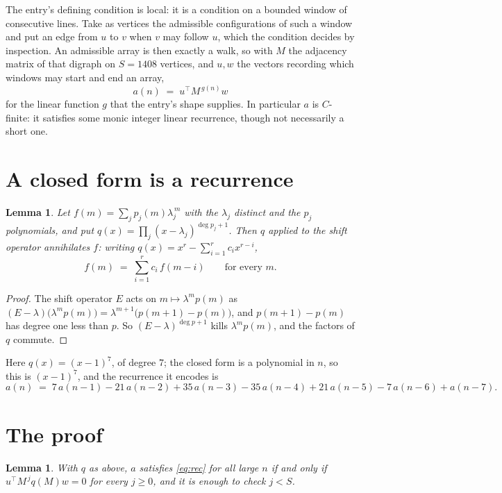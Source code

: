 \documentclass[11pt,a4paper]{article}
\theoremstyle{plain}
\newtheorem{lemma}[theorem]{Lemma}
\theoremstyle{definition}
\begin{document}
The entry's defining condition is local: it is a condition on a bounded window of consecutive lines. Take as vertices the
admissible configurations of such a window and put an edge from $u$ to $v$ when $v$ may
follow $u$, which the condition decides by inspection. An admissible array is then exactly a
walk, so with $M$ the adjacency matrix of that digraph on $S=1408$ vertices, and $u,w$ the
vectors recording which windows may start and end an array,
\[
a(n)\;=\;u^{\!\top}M^{\,g(n)}w
\]
for the linear function $g$ that the entry's shape supplies. In particular $a$ is
$C$-finite: it satisfies some monic integer linear recurrence, though not necessarily a short
one.

\section{A closed form is a recurrence}

\begin{lemma}\label{lem:ann}
Let $f(m)=\sum_{j}p_j(m)\lambda_j^{\,m}$ with the $\lambda_j$ distinct and the $p_j$
polynomials, and put $q(x)=\prod_j(x-\lambda_j)^{\deg p_j+1}$. Then $q$ applied to the shift
operator annihilates $f$: writing $q(x)=x^{r}-\sum_{i=1}^{r}c_ix^{r-i}$,
\[
f(m)\;=\;\sum_{i=1}^{r}c_i\,f(m-i)\qquad\text{for every }m.
\]
\end{lemma}

\begin{proof}
The shift operator $E$ acts on $m\mapsto\lambda^{m}p(m)$ as
$(E-\lambda)\bigl(\lambda^{m}p(m)\bigr)=\lambda^{m+1}\bigl(p(m+1)-p(m)\bigr)$, and
$p(m+1)-p(m)$ has degree one less than $p$. So $(E-\lambda)^{\deg p+1}$ kills
$\lambda^{m}p(m)$, and the factors of $q$ commute.
\end{proof}

Here $q(x)=(x-1)^{7}$, of degree $7$; the closed form is a polynomial in $n$, so this is $(x-1)^{7}$, and the recurrence it encodes is
\begin{equation}\label{eq:rec}
a(n)\;=\;7\,a(n-1) - 21\,a(n-2) + 35\,a(n-3) - 35\,a(n-4) + 21\,a(n-5) - 7\,a(n-6) + a(n-7).
\end{equation}

\section{The proof}

\begin{lemma}\label{lem:crit}
With $q$ as above, $a$ satisfies \eqref{eq:rec} for all large $n$ if and only if
$u^{\!\top}M^{\,j}q(M)w=0$ for every $j\ge0$, and it is enough to check $j<S$.
\end{lemma}
\end{document}
